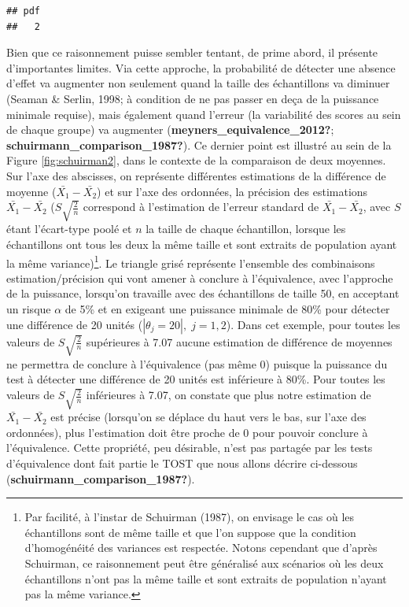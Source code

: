 \documentclass[
  english,
  man]{apa6}
\begin{document}
\begin{verbatim}
## pdf 
##   2
\end{verbatim}

Bien que ce raisonnement puisse sembler tentant, de prime abord, il présente d'importantes limites. Via cette approche, la probabilité de détecter une absence d'effet va augmenter non seulement quand la taille des échantillons va diminuer (Seaman \& Serlin, 1998; à condition de ne pas passer en deça de la puissance minimale requise), mais également quand l'erreur (la variabilité des scores au sein de chaque groupe) va augmenter (\textbf{meyners\_equivalence\_2012?}; \textbf{schuirmann\_comparison\_1987?}). Ce dernier point est illustré au sein de la Figure \ref{fig:schuirman2}, dans le contexte de la comparaison de deux moyennes. Sur l'axe des abscisses, on représente différentes estimations de la différence de moyenne (\(\bar{X_1}-\bar{X_2}\)) et sur l'axe des ordonnées, la précision des estimations \(\bar{X_1}-\bar{X_2}\) (\(S\sqrt{\frac{2}{n}}\) correspond à l'estimation de l'erreur standard de \(\bar{X_1}-\bar{X_2}\), avec \(S\) étant l'écart-type poolé et \(n\) la taille de chaque échantillon, lorsque les échantillons ont tous les deux la même taille et sont extraits de population ayant la même variance)\footnote{Par facilité, à l'instar de Schuirman (1987), on envisage le cas où les échantillons sont de même taille et que l'on suppose que la condition d'homogénéité des variances est respectée. Notons cependant que d'après Schuirman, ce raisonnement peut être généralisé aux scénarios où les deux échantillons n'ont pas la même taille et sont extraits de population n'ayant pas la même variance.}. Le triangle grisé représente l'ensemble des combinaisons estimation/précision qui vont amener à conclure à l'équivalence, avec l'approche de la puissance, lorsqu'on travaille avec des échantillons de taille 50, en acceptant un risque \(\alpha\) de 5\% et en exigeant une puissance minimale de 80\% pour détecter une différence de 20 unités (\(|\theta_j=20|,\;j=1,2\)). Dans cet exemple, pour toutes les valeurs de \(S\sqrt{\frac{2}{n}}\) supérieures à 7.07 aucune estimation de différence de moyennes ne permettra de conclure à l'équivalence (pas même 0) puisque la puissance du test à détecter une différence de 20 unités est inférieure à 80\%. Pour toutes les valeurs de \(S\sqrt{\frac{2}{n}}\) inférieures à 7.07, on constate que plus notre estimation de \(\bar{X_1}-\bar{X_2}\) est précise (lorsqu'on se déplace du haut vers le bas, sur l'axe des ordonnées), plus l'estimation doit être proche de 0 pour pouvoir conclure à l'équivalence. Cette propriété, peu désirable, n'est pas partagée par les tests d'équivalence dont fait partie le TOST que nous allons décrire ci-dessous (\textbf{schuirmann\_comparison\_1987?}).
\end{document}
